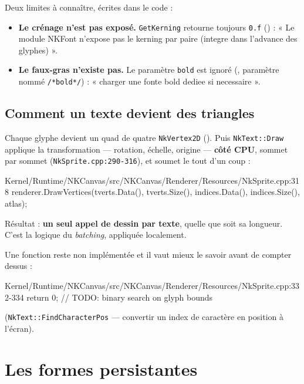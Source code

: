 Deux limites à connaître, écrites dans le code :

\begin{itemize}
  \item \textbf{Le crénage n'est pas exposé.} \texttt{GetKerning} retourne
        toujours \texttt{0.f} () : « Le module NKFont
        n'expose pas le kerning par paire (integre dans l'advance des glyphes) ».
  \item \textbf{Le faux-gras n'existe pas.} Le paramètre \texttt{bold} est
        ignoré (, paramètre nommé \texttt{/*bold*/}) :
        « charger une fonte bold dediee si necessaire ».
\end{itemize}

\subsection{Comment un texte devient des triangles}

Chaque glyphe devient un quad de quatre \texttt{NkVertex2D}
(). Puis
\texttt{NkText::Draw} applique la transformation — rotation, échelle, origine —
\textbf{côté CPU}, sommet par sommet (\texttt{NkSprite.cpp:290-316}), et soumet
le tout d'un coup :

\begin{nkcode}{Kernel/Runtime/NKCanvas/src/NKCanvas/Renderer/Resources/NkSprite.cpp:318}
renderer.DrawVertices(tverts.Data(), tverts.Size(),
                      indices.Data(), indices.Size(), atlas);
\end{nkcode}

\noindent Résultat : \textbf{un seul appel de dessin par texte}, quelle que soit
sa longueur. C'est la logique du \emph{batching}, appliquée localement.

Une fonction reste non implémentée et il vaut mieux le savoir avant de compter
dessus :

\begin{nkcode}{Kernel/Runtime/NKCanvas/src/NKCanvas/Renderer/Resources/NkSprite.cpp:332-334}
return 0; // TODO: binary search on glyph bounds
\end{nkcode}

\noindent (\texttt{NkText::FindCharacterPos} — convertir un index de caractère en
position à l'écran).

\section{Les formes persistantes}


